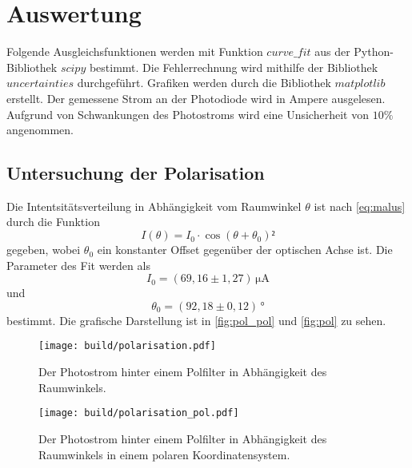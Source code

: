 \section{Auswertung}
\label{sec:auswertung}

Folgende Ausgleichsfunktionen werden mit Funktion $curve\_fit$ aus der Python\cite{py}-Bibliothek $scipy$\cite{2020SciPy-NMeth} bestimmt.
Die Fehlerrechnung wird mithilfe der Bibliothek $uncertainties$ \cite{unp} durchgeführt.
Grafiken werden durch die Bibliothek $matplotlib$\cite{Hunter:2007} erstellt. Der gemessene Strom an der Photodiode wird in Ampere ausgelesen.  
Aufgrund von Schwankungen des Photostroms wird eine Unsicherheit von $10 \%$ angenommen.

\subsection{Untersuchung der Polarisation}
\label{sec:Polarisation}

Die Intentsitätsverteilung in Abhängigkeit vom Raumwinkel $\theta$ ist nach \eqref{eq:malus} durch die Funktion
\begin{equation*}
    I(\theta) = I_0 \cdot \cos(\theta + \theta_0)² %
\end{equation*}
gegeben, wobei $\theta_0 $ ein konstanter Offset gegenüber der optischen Achse ist. 
Die Parameter des Fit werden als
\begin{equation*}
    I_0      = (69,16 \pm    1,27) \, \unit{\micro\ampere}
\end{equation*}
und
\begin{equation*}
    \theta_0 = (92,18 \pm    0,12) \, °  
\end{equation*}
bestimmt. Die grafische Darstellung ist in  \autoref{fig:pol_pol} und \autoref{fig:pol} zu sehen.

\begin{figure}[H]
    \centering
    \texttt{[image: build/polarisation.pdf]}
    \caption{Der Photostrom hinter einem Polfilter in Abhängigkeit des Raumwinkels.}
    \label{fig:pol}
\end{figure}

\begin{figure}[H]
    \centering
    \texttt{[image: build/polarisation\_pol.pdf]}
    \caption{Der Photostrom hinter einem Polfilter in Abhängigkeit des Raumwinkels in einem polaren Koordinatensystem.}
    \label{fig:pol_pol}
\end{figure}

